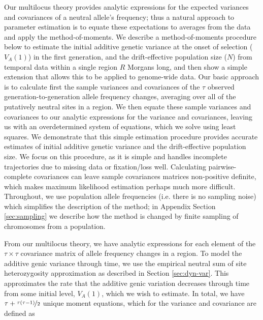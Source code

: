 \documentclass[11pt]{article}
\begin{document}
Our multilocus theory provides analytic expressions for the expected variances
and covariances of a neutral allele's frequency; thus a natural approach to
parameter estimation is to equate these expectations to averages from the data
and apply the method-of-moments. We describe a method-of-moments procedure
below to estimate the initial additive genetic variance at the onset of
selection ($V_A(1)$) in the first generation, and the drift-effective
population size ($N$) from temporal data within a single region $R$ Morgans
long, and then show a simple extension that allows this to be applied to
genome-wide data. Our basic approach is to calculate first the sample variances
and covariances of the $\tau$ observed generation-to-generation allele
frequency changes, averaging over all of the putatively neutral sites in a
region. We then equate these sample variances and covariances to our analytic
expressions for the variance and covariances, leaving us with an overdetermined
system of equations, which we solve using least squares. We demonstrate that this
simple estimation procedure provides accurate estimates of initial additive
genetic variance and the drift-effective population size. We focus on this
  procedure, as it is simple and handles  incomplete trajectories due to
  missing data or fixation/loss well. Calculating pairwise-complete covariances
  can leave sample covariances matrices non-positive definite, which makes
  maximum likelihood estimation perhaps much more difficult. Throughout, we use
  population allele frequencies (i.e.  there is no sampling noise) which
  simplifies the description of the method; in Appendix Section
  \ref{sec:sampling} we describe how the method is changed by finite sampling
  of chromosomes from a population. 

From our multilocus theory, we have analytic expressions for each element of
the $\tau \times \tau$ covariance matrix of allele frequency changes in a
region. To model the additive genic variance through time, we use the empirical
neutral sum of site heterozygosity approximation as described in Section
\ref{sec:dyn-var}. This approximates the rate that the additive genic variation
decreases through time from some initial level, $V_A(1)$, which we wish to
estimate. In total, we have $\tau + \nicefrac{\tau(\tau-1)}{2}$ unique moment
equations, which for the variance and covariance are defined as
\end{document}
